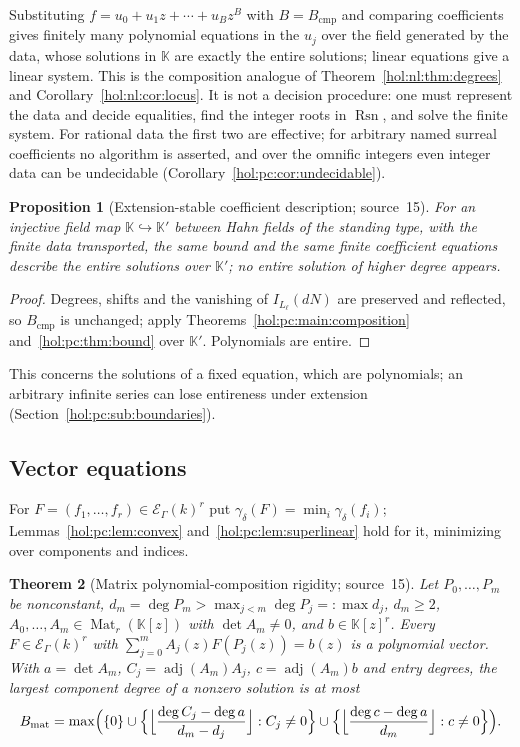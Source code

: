 \documentclass[11pt]{article}
\numberwithin{equation}{section}
\newtheorem{theorem}{Theorem}[section]
\newtheorem{proposition}[theorem]{Proposition}
\theoremstyle{definition}
\theoremstyle{remark}
\newcommand{\KK}{\mathbb K}
\newcommand{\EK}{\mathcal E_\Gamma(k)}
\begin{document}
Substituting $f=u_0+u_1z+\cdots+u_Bz^B$ with $B=B_{\mathrm{cmp}}$ and comparing
coefficients gives finitely many polynomial equations in the $u_j$ over the
field generated by the data, whose solutions in $\KK$ are exactly the entire
solutions; linear equations give a linear system. This is the composition
analogue of Theorem~\ref{hol:nl:thm:degrees} and
Corollary~\ref{hol:nl:cor:locus}. It is not a decision procedure: one must
represent the data and decide equalities, find the integer roots in
$\operatorname{Rsn}$, and solve the finite system. For rational data the first
two are effective; for arbitrary named surreal coefficients no algorithm is
asserted, and over the omnific integers even integer data can be undecidable
(Corollary~\ref{hol:pc:cor:undecidable}).

\begin{proposition}[Extension-stable coefficient description; source~15]
\label{hol:pc:prop:extension}
For an injective field map $\KK\hookrightarrow\KK'$ between Hahn fields of the
standing type, with the finite data transported, the same bound and the same
finite coefficient equations describe the entire solutions over $\KK'$; no
entire solution of higher degree appears.
\end{proposition}

\begin{proof}
Degrees, shifts and the vanishing of $I_{L_\ell}(dN)$ are preserved and
reflected, so $B_{\mathrm{cmp}}$ is unchanged; apply
Theorems~\ref{hol:pc:main:composition} and~\ref{hol:pc:thm:bound} over
$\KK'$. Polynomials are entire.
\end{proof}

This concerns the solutions of a fixed equation, which are polynomials; an
arbitrary infinite series can lose entireness under extension
(Section~\ref{hol:pc:sub:boundaries}).

\subsection{Vector equations}\label{hol:pc:sub:matrix}

For $F=(f_1,\ldots,f_r)\in\EK^r$ put $\gamma_\delta(F)=\min_i\gamma_\delta(f_i)$;
Lemmas~\ref{hol:pc:lem:convex} and~\ref{hol:pc:lem:superlinear} hold for it,
minimizing over components and indices.

\begin{theorem}[Matrix polynomial-composition rigidity; source~15]
\label{hol:pc:thm:matrix}
Let $P_0,\ldots,P_m$ be nonconstant, $d_m=\deg P_m>\max_{j<m}\deg P_j=:\max
d_j$, $d_m\ge2$, $A_0,\ldots,A_m\in\operatorname{Mat}_r(\KK[z])$ with $\det
A_m\ne0$, and $b\in\KK[z]^r$. Every $F\in\EK^r$ with
$\sum_{j=0}^mA_j(z)F(P_j(z))=b(z)$ is a polynomial vector. With $a=\det A_m$,
$C_j=\operatorname{adj}(A_m)A_j$, $c=\operatorname{adj}(A_m)b$ and entry
degrees, the largest component degree of a nonzero solution is at most
\[
 B_{\mathrm{mat}}=\max\Bigl(\{0\}\cup\Bigl\{\Bigl\lfloor\frac{\deg C_j-\deg a}
 {d_m-d_j}\Bigr\rfloor:C_j\ne0\Bigr\}\cup\Bigl\{\Bigl\lfloor\frac{\deg c-\deg a}
 {d_m}\Bigr\rfloor:c\ne0\Bigr\}\Bigr).
\]
\end{theorem}
\end{document}
